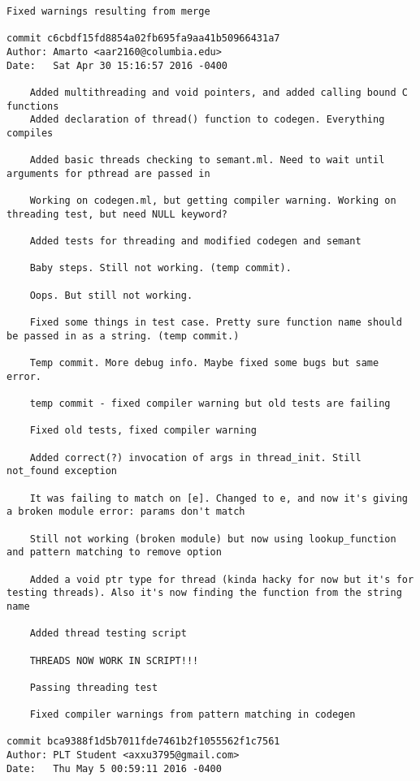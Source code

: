 \begin{lstlisting}[backgroundcolor=\color{white}]
    Fixed warnings resulting from merge

commit c6cbdf15fd8854a02fb695fa9aa41b50966431a7
Author: Amarto <aar2160@columbia.edu>
Date:   Sat Apr 30 15:16:57 2016 -0400

    Added multithreading and void pointers, and added calling bound C functions
    Added declaration of thread() function to codegen. Everything compiles
    
    Added basic threads checking to semant.ml. Need to wait until arguments for pthread are passed in
    
    Working on codegen.ml, but getting compiler warning. Working on threading test, but need NULL keyword?
    
    Added tests for threading and modified codegen and semant
    
    Baby steps. Still not working. (temp commit).
    
    Oops. But still not working.
    
    Fixed some things in test case. Pretty sure function name should be passed in as a string. (temp commit.)
    
    Temp commit. More debug info. Maybe fixed some bugs but same error.
    
    temp commit - fixed compiler warning but old tests are failing
    
    Fixed old tests, fixed compiler warning
    
    Added correct(?) invocation of args in thread_init. Still not_found exception
    
    It was failing to match on [e]. Changed to e, and now it's giving a broken module error: params don't match
    
    Still not working (broken module) but now using lookup_function and pattern matching to remove option
    
    Added a void ptr type for thread (kinda hacky for now but it's for testing threads). Also it's now finding the function from the string name
    
    Added thread testing script
    
    THREADS NOW WORK IN SCRIPT!!!
    
    Passing threading test
    
    Fixed compiler warnings from pattern matching in codegen

commit bca9388f1d5b7011fde7461b2f1055562f1c7561
Author: PLT Student <axxu3795@gmail.com>
Date:   Thu May 5 00:59:11 2016 -0400


\end{lstlisting}
